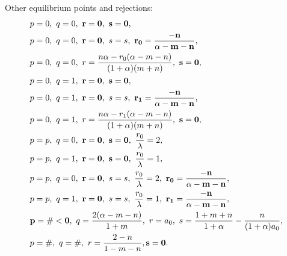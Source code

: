 \documentclass[a4paper,11pt]{article}
\begin{document}
Other equilibrium points and rejections:
\begin{align*}
 &p=0, \ q=0, \ {\bf r=0, \ s=0},\\
 &p=0, \ q=0, \ {\bf r=0},\ s=s, \ {\bf r_0 = \frac{-n}{\alpha-m-n}},\\
 &p=0, \ q=0, \ r = \frac{n\alpha - r_0(\alpha-m-n)}{(1+\alpha)(m+n)},\ {\bf s=0},\\
 &p=0, \ q=1, \ {\bf r=0, \ s=0}, \\
 &p=0, \ q=1, \ {\bf r=0},\ s=s, \ {\bf r_1 = \frac{-n}{\alpha-m-n}},\\
 &p=0, \ q=1, \ r = \frac{n\alpha - r_1(\alpha-m-n)}{(1+\alpha)(m+n)},\ {\bf s=0},\\
 &p=p, \ q=0, \ {\bf r=0, \ s=0}, \ \frac{r_0}{\lambda}=2, \\ 
 &p=p, \ q=1, \ {\bf r=0, \ s=0}, \ \frac{r_0}{\lambda}=1, \\
 &p=p, \ q=0, \ {\bf r=0}, \ s=s, \ \frac{r_0}{\lambda}=2, \ {\bf r_0 = \frac{-n}{\alpha-m-n}}, \\
 &p=p, \ q=1, \ {\bf r=0}, \ s=s, \ \frac{r_0}{\lambda}=1, \ {\bf r_1 = \frac{-n}{\alpha-m-n}}, \\
 &{\bf p=\#<0}, \ q=\frac{2(\alpha-m-n)}{1+m}, \ r=a_0, \ s=\frac{1+m+n}{1+\alpha} - \frac{n}{(1+\alpha)a_0},\\
 &p=\#, \ q=\#, \ r = \frac{2-n}{1-m-n}, {\bf s=0}.
\end{align*}

% 
\end{document}

